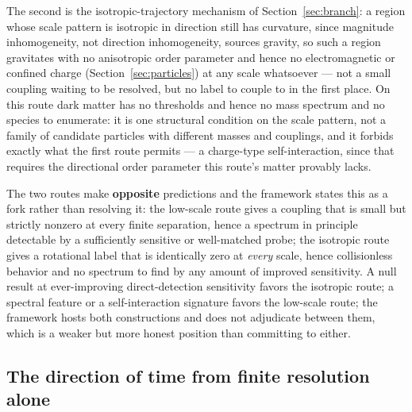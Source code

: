 \documentclass[pdflatex,sn-mathphys-num]{sn-jnl}
\theoremstyle{thmstyleone}
\theoremstyle{thmstylethree}
\theoremstyle{thmstyletwo}
\begin{document}
The second is the isotropic-trajectory mechanism of
Section~\ref{sec:branch}: a region whose scale pattern is isotropic in
direction still has curvature, since magnitude inhomogeneity, not
direction inhomogeneity, sources gravity, so such a region gravitates
with no anisotropic order parameter and hence no electromagnetic or
confined charge (Section~\ref{sec:particles}) at any scale whatsoever —
not a small coupling waiting to be resolved, but no label to couple to
in the first place. On this route dark matter has no thresholds and
hence no mass spectrum and no species to enumerate: it is one structural
condition on the scale pattern, not a family of candidate particles with
different masses and couplings, and it forbids exactly what the first
route permits — a charge-type self-interaction, since that requires the
directional order parameter this route's matter provably lacks.

The two routes make \textbf{opposite} predictions and the framework
states this as a fork rather than resolving it: the low-scale route
gives a coupling that is small but strictly nonzero at every finite
separation, hence a spectrum in principle detectable by a sufficiently
sensitive or well-matched probe; the isotropic route gives a rotational
label that is identically zero at \emph{every} scale, hence collisionless
behavior and no spectrum to find by any amount of improved sensitivity.
A null result at ever-improving direct-detection sensitivity favors the
isotropic route; a spectral feature or a self-interaction signature
favors the low-scale route; the framework hosts both constructions and
does not adjudicate between them, which is a weaker but more honest
position than committing to either.

\subsection{The direction of time from finite resolution alone}
\end{document}
